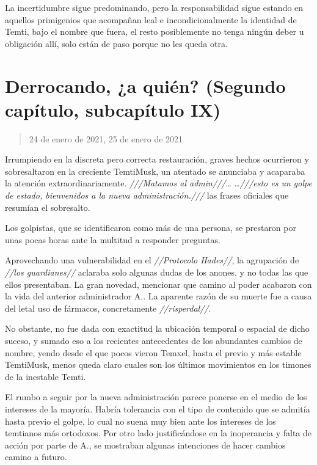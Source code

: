 \documentclass[
  spanish,
]{book}
\begin{document}
La incertidumbre sigue predominando, pero la responsabilidad sigue estando en aquellos primigenios que acompañan leal e incondicionalmente la identidad de Temti, bajo el nombre que fuera, el resto posiblemente no tenga ningún deber u obligación allí, solo están de paso porque no les queda otra.

\hypertarget{derrocando-a-quiuxe9n-segundo-capuxedtulo-subcapuxedtulo-ix}{%
\section{Derrocando, ¿a quién? (Segundo capítulo, subcapítulo IX)}\label{derrocando-a-quiuxe9n-segundo-capuxedtulo-subcapuxedtulo-ix}}

\begin{quote}
24 de enero de 2021, 25 de enero de 2021
\end{quote}

Irrumpiendo en la discreta pero correcta restauración, graves hechos ocurrieron y sobresaltaron en la creciente TemtiMusk, un atentado se anunciaba y acaparaba la atención extraordinariamente.
\emph{///Matamos al admin///}\ldots{} \ldots{}\emph{///esto es un golpe de estado, bienvenidos a la nueva administración.///} las frases oficiales que resumían el sobresalto.

Los golpistas, que se identificaron como más de una persona, se prestaron por unas pocas horas ante la multitud a responder preguntas.

Aprovechando una vulnerabilidad en el \emph{//Protocolo Hades//}, la agrupación de \emph{//los guardianes//} aclaraba solo algunas dudas de los anones, y no todas las que ellos presentaban.
La gran novedad, mencionar que camino al poder acabaron con la vida del anterior administrador A.. La aparente razón de su muerte fue a causa del letal uso de fármacos, concretamente \emph{//risperdal//}.

No obstante, no fue dada con exactitud la ubicación temporal o espacial de dicho suceso, y sumado eso a los recientes antecedentes de los abundantes cambios de nombre, yendo desde el que pocos vieron Temxel, hasta el previo y más estable TemtiMusk, menos queda claro cuales son los últimos movimientos en los timones de la inestable Temti.

El rumbo a seguir por la nueva administración parece ponerse en el medio de los intereses de la mayoría. Habría tolerancia con el tipo de contenido que se admitía hasta previo el golpe, lo cual no suena muy bien ante los intereses de los temtianos más ortodoxos. Por otro lado justificándose en la inoperancia y falta de acción por parte de A., se mostraban algunas intenciones de hacer cambios camino a futuro.
\end{document}
